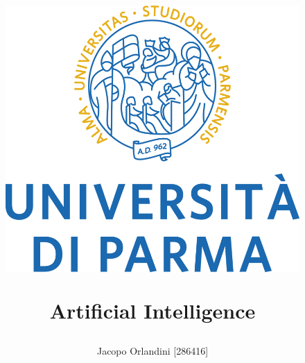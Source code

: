 \documentclass{report}
\begin{document}
\title{
\begin{figure}[htbp]
\centering
\includegraphics[scale=0.15]{logo.png}
\end{figure}
Artificial Intelligence\\
\begin{large} [1007315]
\end{large}}
\author{Jacopo Orlandini [286416]}


\maketitle
\end{document}
